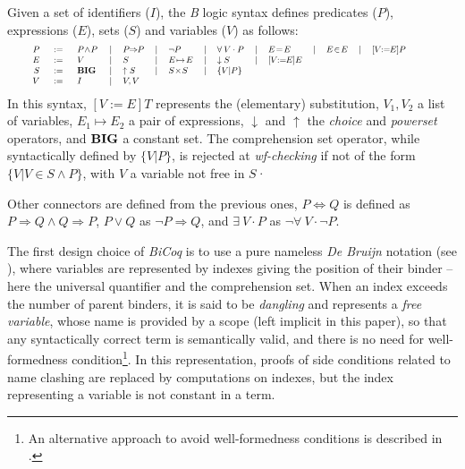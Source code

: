 \documentclass{llncs}
\begin{document}
Given a set of identifiers ($I$), the \emph{B} logic syntax defines predicates ($P$), 
expressions ($E$), sets ($S$) and variables ($V$) as follows:
\[
\small
\begin{array}{rclclclclclclclcl}
\rule{1.0cm}{0cm} &
\rule{0.7cm}{0cm} & \rule{0.8cm}{0cm} &
\rule{0.2cm}{0cm} & \rule{0.8cm}{0cm} &
\rule{0.2cm}{0cm} & \rule{0.8cm}{0cm} &
\rule{0.2cm}{0cm} & \rule{0.8cm}{0cm} &
\rule{0.2cm}{0cm} & \rule{0.8cm}{0cm} &
\rule{0.2cm}{0cm} & \rule{0.8cm}{0cm} &
\rule{0.2cm}{0cm} & \rule{0.8cm}{0cm} &
\rule{0.2cm}{0cm} & \rule{0.8cm}{0cm} \vspace{-12pt} \\
P &:=& P\!\land\!P &|& P\!\!\Rightarrow\!\!P &|& \lnot P &|& \forall\:V\cdot P
        &|& E\!=\!E &|& E\!\in\!E &|& [V\!\!:=\!\!E]P 
\\
E &:=& V &|& S &|& E\!\mapsto\!E  &|& \downarrow S &|& [V\!\!:=\!\!E]E 
\\
S &:=& \Bcmd{BIG} &|& \uparrow S &|& S\!\times\!S  &|& \{V|P\} 
\\
V &:=& I &|& V,V
\end{array}
\]
In this syntax, $[V\!:=\!E]T$ represents the (elementary) substitution, $V_1,V_2$ a list 
of variables, $E_1\!\mapsto\!E_2$ a pair of expressions, $\!\downarrow\!$ and  $\!\uparrow\!$ 
the \emph{choice} and \emph{powerset} operators, and $\mathbf{BIG}$ a constant set. The 
comprehension set operator, while syntactically defined by $\{V|P\}$, is rejected at 
\emph{wf-checking} if not of the form $\{V|V\!\in\!S\!\land\!P\}$, with $V$ a variable not 
free in $S$·

\begin{defn}\small Other connectors are defined from the previous ones,
$P\!\!\Leftrightarrow\!\!Q$ is defined as $P\!\!\Rightarrow\!\!Q \land Q\!\!\Rightarrow\!\!P$, 
$P\!\lor\!Q$ as $\lnot P\!\!\Rightarrow\!\!Q$, and $\exists\:V\!\cdot\!P$ as 
$\lnot\forall\:V\!\cdot\!\lnot P$.
\end{defn}

The first design choice of \emph{BiCoq} is to use a pure nameless \emph{De Bruijn} notation
(see \cite{deb:1,ayd:1}), where variables are represented by indexes giving the position of 
their binder -- here the universal quantifier and the comprehension set. When an index exceeds 
the number of parent binders, it is said to be \emph{dangling} and represents a
\emph{free variable}, whose name is provided by a scope (left implicit in this paper), so that 
any syntactically correct term is semantically valid, and there is no need for well-formedness 
condition\footnote{An alternative approach to avoid well-formedness conditions is described in 
\cite{pat:1}.}. In this representation, proofs of side conditions related to name clashing are 
replaced by computations on indexes, but the index representing a variable is not constant in 
a term.
\end{document}
